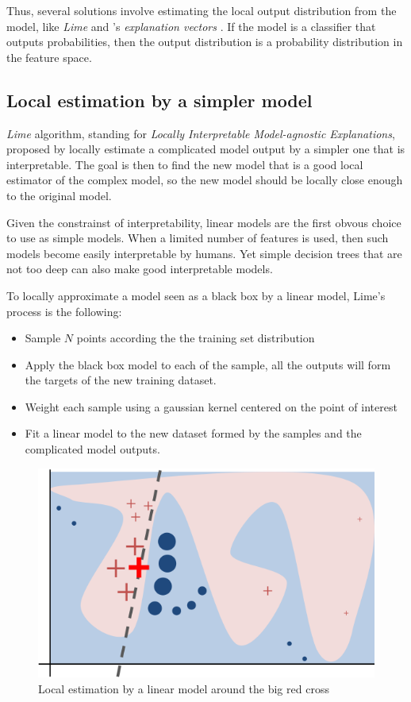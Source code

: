 \documentclass[a4paper,11pt]{kth-mag}
\begin{document}
Thus, several solutions involve estimating the local output distribution from the model, like \textit{Lime} \cite{lime} and \citeauthor{explvect}'s \textit{explanation vectors} \cite{explvect}. If the model is a classifier that outputs probabilities, then the output distribution is a probability distribution in the feature space. 

\subsection{Local estimation by a simpler model}

\textit{Lime} algorithm, standing for \textit{Locally Interpretable Model-agnostic Explanations}, proposed by \citeauthor{lime} \cite{lime} locally estimate a complicated model output by a simpler one that is interpretable. The goal is then to find the new model that is a good local estimator of the complex model, so the new model should be locally close enough to the original model. 

Given the constrainst of interpretability, linear models are the first obvous choice to use as simple models. When a limited number of features is used, then such models become easily interpretable by humans. Yet simple decision trees that are not too deep can also make good interpretable models.

To locally approximate a model seen as a black box by a linear model, Lime's process is the following:

\begin{itemize}
	\item Sample $N$ points according the the training set distribution
	\item Apply the black box model to each of the sample, all the outputs will form the targets of the new training dataset.
	\item Weight each sample using a gaussian kernel centered on the point of interest
	\item Fit a linear model to the new dataset formed by the samples and the complicated model outputs.
\end{itemize}

\begin{figure}[!h]
	\centering
   	\def\svgwidth{\columnwidth}
	\includegraphics{lime-schema.png}
    \caption{Local estimation by a linear model around the big red cross}
\end{figure}
\end{document}
